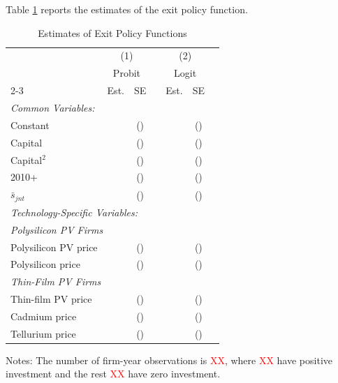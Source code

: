 \documentclass[12pt]{article}
\begin{document}
Table \ref{tab:est_exit_policy_func} reports the estimates of the exit policy function.

\begin{table}[!h]
\centering
\caption{Estimates of Exit Policy Functions}
\label{tab:est_exit_policy_func}
\begin{threeparttable}
\begin{tabularx}{0.75\textwidth}{Xcccccc}
\toprule
 & \multicolumn{2}{c}{(1)} && \multicolumn{2}{c}{(2)} \\
 & \multicolumn{2}{c}{Probit} && \multicolumn{2}{c}{Logit} \\
\cmidrule{2-3} \cmidrule{5-6}
 & Est. & SE && Est. & SE \\
\midrule
\multicolumn{5}{l}{\textit{Common Variables:}} \\
Constant &   &  () &&  &  ()\\
Capital &   &  () &&  &  ()\\
Capital$^2$ &   &  () &&  &  ()\\
2010+  &   &  () &&  & () \\
$\bar{s}_{jnt}$  &   &  () &&  & () \\
\multicolumn{5}{l}{\textit{Technology-Specific Variables:}} \\
\multicolumn{5}{l}{\textit{Polysilicon PV Firms}} \\
\quad Polysilicon PV price  &   &  () &&  &  ()\\
\quad Polysilicon price  &   &  () &&  &  ()\\
\multicolumn{5}{l}{\textit{Thin-Film PV Firms}} \\
\quad Thin-film PV price &   &  () &&  & () \\
\quad Cadmium price  &   &  () &&  & () \\
\quad Tellurium price  &   &  () &&  & () \\
\bottomrule
\end{tabularx}
\begin{tablenotes}
  \item  Notes: The number of firm-year observations is \textcolor{red}{XX}, where \textcolor{red}{XX} have positive investment and the rest \textcolor{red}{XX} have zero investment.
\end{tablenotes}
\end{threeparttable}
\end{table}
\end{document}
